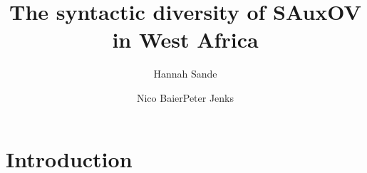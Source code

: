 \documentclass[output=paper,newtxmath,modfonts,nonflat,draftmode]{langsci/langscibook}
\author{Hannah Sande\affiliation{Georgetown University}\and Nico Baier\affiliation{McGill University}\lastand Peter Jenks\affiliation{UC Berkeley}}
\title{The syntactic diversity of SAuxOV in West Africa}
\begin{document}
\maketitle

\section{Introduction} 
 
%
%
%
%
%

\end{document}
